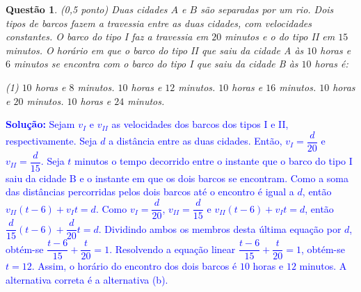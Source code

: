 \documentclass[oneside,a4paper,12pt]{article}
\newcommand{\negrito}[1]{\mbox{\boldmath{$#1$}}}
\theoremstyle{Colorido}
\theoremstyle{solu}
\theoremstyle{dotlessP}
\newtheorem{sol}{Questão}
\begin{document}
	\begin{sol}
\textit{(0,5 ponto)} 
Duas cidades $A$ e $B$ são separadas por um rio. Dois tipos de barcos fazem a travessia entre as duas cidades, com velocidades constantes. O barco do tipo I faz a travessia em $20$ minutos e o do tipo II em $15$ minutos. O horário em que o barco do tipo II que saiu da cidade A às $10$ horas e $6$ minutos se encontra com o barco do tipo I que saiu da cidade B às $10$ horas é:
\begin{tasks}[counter-format={(tsk[a])},label-width=3.6ex, label-format = {\bfseries}, column-sep = {20pt}](1)
\task[\textcolor{blue}{$\negrito{(a)} $}] $10$ horas e $8$ minutos.
\task[\textcolor{blue}{$\negrito{(b)} $}] $10$ horas e $12$ minutos.
\task[\textcolor{blue}{$\negrito{(c)} $}] $10$ horas e $16$ minutos.
\task[\textcolor{blue}{$\negrito{(d)} $}] $10$ horas e $20$ minutos.
\task[\textcolor{blue}{$\negrito{(e)} $}] $10$ horas e $24$ minutos.
\end{tasks}
\end{sol}
\textcolor{blue}{\textbf{Solução:}
Sejam $v_I$ e $v_{II}$ as velocidades dos barcos dos tipos I e II, respectivamente. Seja $d$ a distância entre as duas cidades. Então, $v_I=\dfrac{d}{20}$ e $v_{II}=\dfrac{d}{15}$. Seja $t$ minutos o tempo decorrido entre o instante que o barco do tipo I saiu da cidade B e o instante em que os dois barcos se encontram. Como a soma das distâncias percorridas pelos dois barcos até o encontro é igual a $d$, então $v_{II}(t-6)+v_It=d$. Como $v_I=\dfrac{d}{20}$, $v_{II}=\dfrac{d}{15}$ e $v_{II}(t-6)+v_It=d$, então $\dfrac{d}{15}(t-6)+\dfrac{d}{20}t=d$. Dividindo ambos os membros desta última equação por $d$, obtém-se $\dfrac{t-6}{15}+\dfrac{t}{20}=1$. Resolvendo a equação linear $\dfrac{t-6}{15}+\dfrac{t}{20}=1$, obtém-se $t=12$. Assim, o horário do encontro dos dois barcos é $10$ horas e $12$ minutos. A alternativa correta é a alternativa (b).
}
		\newpage	
\end{document}
